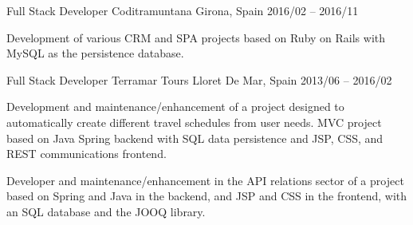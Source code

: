 \documentclass[]{awesome-cv}
\begin{document}
\begin{cventries}
	\cventry
	{Full Stack Developer}
	{Coditramuntana}
	{Girona, Spain}
	{2016/02 – 2016/11}
	{\begin{cvitems}
		\vspace{0.5mm}
		\item {Development of various CRM and SPA projects based on Ruby on Rails with MySQL as the persistence database.}
		\end{cvitems}}


	\cventry
	{Full Stack Developer}
	{Terramar Tours}
	{Lloret De Mar, Spain}
	{2013/06 – 2016/02}
	{\begin{cvitems}
		\vspace{0.5mm}
		\item {Development and maintenance/enhancement of a project designed to automatically create different travel schedules from user needs. MVC project based on Java Spring backend with SQL data persistence and JSP, CSS, and REST communications frontend.}
  \item {Developer and maintenance/enhancement in the API relations sector of a project based on Spring and Java in the backend, and JSP and CSS in the frontend, with an SQL database and the JOOQ library.}
		\end{cvitems}}
\end{cventries}

\vspace{5mm}
\end{document}
